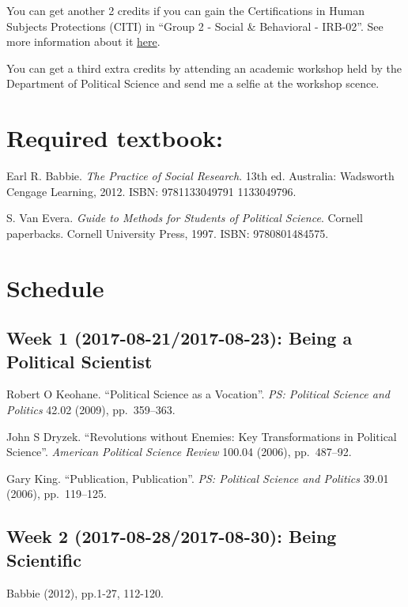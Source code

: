 \documentclass[11pt,]{article}
\theoremstyle{definition}
\theoremstyle{definition}
\theoremstyle{remark}
\begin{document}
You can get another 2 credits if you can gain the Certifications in
Human Subjects Protections (CITI) in ``Group 2 - Social \& Behavioral -
IRB-02''. See more information about it
\href{https://hso.research.uiowa.edu/certifications-human-subjects-protections-citi}{here}.

You can get a third extra credits by attending an academic workshop held
by the Department of Political Science and send me a selfie at the
workshop scence.

\section{Required textbook:}\label{required-textbook}

Earl R. Babbie. \emph{The Practice of Social Research}. 13th ed.
Australia: Wadsworth Cengage Learning, 2012. ISBN: 9781133049791
1133049796.

S. Van Evera. \emph{Guide to Methods for Students of Political Science}.
Cornell paperbacks. Cornell University Press, 1997. ISBN: 9780801484575.

\section{Schedule}\label{schedule}

\subsection{Week 1 (2017-08-21/2017-08-23): Being a Political
Scientist}\label{week-1-2017-08-212017-08-23-being-a-political-scientist}

Robert O Keohane. ``Political Science as a Vocation''.
\emph{PS: Political Science and Politics} 42.02 (2009), pp.~359--363.

John S Dryzek. ``Revolutions without Enemies: Key Transformations in
Political Science''. \emph{American Political Science Review} 100.04
(2006), pp.~487--92.

Gary King. ``Publication, Publication''.
\emph{PS: Political Science and Politics} 39.01 (2006), pp.~119--125.

\subsection{Week 2 (2017-08-28/2017-08-30): Being
Scientific}\label{week-2-2017-08-282017-08-30-being-scientific}

Babbie (2012), pp.1-27, 112-120.
\end{document}
